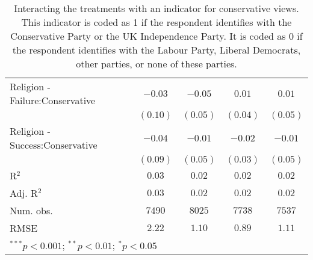 \begin{table}[H]
\begin{center}
\begin{footnotesize}
\begin{tabular}{l c c c c}
Religion - Failure:Conservative  & $-0.03$       & $-0.05$       & $0.01$        & $0.01$        \\
                                 & $(0.10)$      & $(0.05)$      & $(0.04)$      & $(0.05)$      \\
Religion - Success:Conservative  & $-0.04$       & $-0.01$       & $-0.02$       & $-0.01$       \\
                                 & $(0.09)$      & $(0.05)$      & $(0.03)$      & $(0.05)$      \\
\hline
R$^2$                            & $0.03$        & $0.02$        & $0.02$        & $0.02$        \\
Adj. R$^2$                       & $0.03$        & $0.02$        & $0.02$        & $0.02$        \\
Num. obs.                        & $7490$        & $8025$        & $7738$        & $7537$        \\
RMSE                             & $2.22$        & $1.10$        & $0.89$        & $1.11$        \\
\hline
\multicolumn{5}{l}{\tiny{$^{***}p<0.001$; $^{**}p<0.01$; $^{*}p<0.05$}}
\end{tabular}
\end{footnotesize}
\caption{Interacting the treatments with an indicator for conservative views. This indicator is coded as 
       1 if the respondent identifies with the Conservative Party or the UK Independence Party. It is coded as 0 
       if the respondent identifies with the Labour Party, Liberal Democrats, other parties, or none of these 
       parties.}
\label{tab:ate_conservative}
\end{center}
\end{table}
